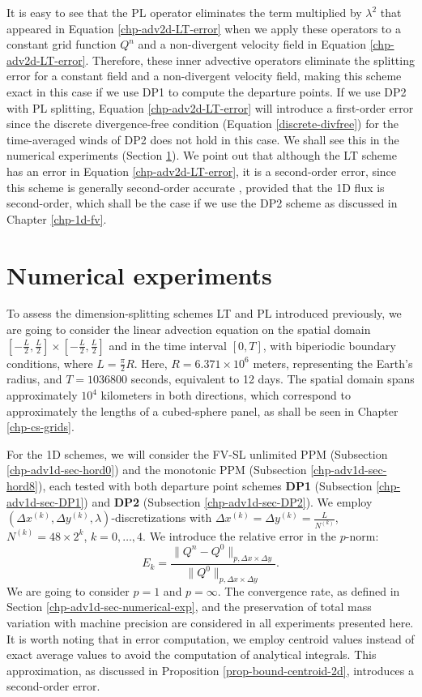 It is easy to see that the PL operator eliminates the term multiplied by $\lambda^2$ that appeared in Equation \eqref{chp-adv2d-LT-error}
when we apply these operators to a constant grid function $Q^n$ and a non-divergent velocity field in Equation \eqref{chp-adv2d-LT-error}.
Therefore, these inner advective operators eliminate the splitting error for a constant field and a non-divergent velocity field, making this scheme exact in this case
if we use DP1 to compute the departure points.
If we use DP2 with PL splitting, Equation \eqref{chp-adv2d-LT-error} will introduce a first-order error since the discrete divergence-free condition (Equation \eqref{discrete-divfree})
for the time-averaged winds of DP2 does not hold in this case.
We shall see this in the numerical experiments (Section \ref{sec-ds-exp}).
We point out that although the LT scheme has an error in Equation \eqref{chp-adv2d-LT-error}, it is a second-order error,
since this scheme is generally second-order accurate \citep{holden:2010}, provided that the 1D flux is second-order, 
which shall be the case if we use the DP2 scheme as discussed in Chapter \ref{chp-1d-fv}.

\section{Numerical experiments}
\label{sec-ds-exp}
To assess the dimension-splitting schemes LT and PL introduced previously, we are going to consider the linear advection 
equation on the spatial domain $[-\frac{L}{2},\frac{L}{2}]\times[-\frac{L}{2},\frac{L}{2}]$ and in the time interval $[0,T]$, 
with biperiodic boundary conditions, where $L = \frac{\pi}{2} R$. Here, $R = 6.371 \times 10^6$ meters, 
representing the Earth's radius, and $T = 1036800$ seconds, equivalent to 12 days. 
The spatial domain spans approximately $10^4$ kilometers in both directions,
which correspond to approximately the lengths of a cubed-sphere panel,
as shall be seen in Chapter \ref{chp-cs-grids}.

For the 1D schemes, we will consider the FV-SL unlimited PPM (Subsection \ref{chp-adv1d-sec-hord0}) and the monotonic PPM
(Subsection \ref{chp-adv1d-sec-hord8}), 
each tested with both departure point schemes \textbf{DP1} (Subsection \ref{chp-adv1d-sec-DP1}) and \textbf{DP2} (Subsection \ref{chp-adv1d-sec-DP2}).
We employ $(\Delta x^{(k)},\Delta y^{(k)},\lambda)$-discretizations with $\Delta x^{(k)} = \Delta y^{(k)} = \frac{L}{N^{(k)}}$,
$N^{(k)} = 48 \times 2^k$, $k=0,\ldots, 4$.
We introduce the relative error in the $p$-norm:
\begin{equation*}
	E_k = 
	\frac{\| Q^n - Q^0 \|_{p, \Delta x \times \Delta y}}
	{\|Q^0\|_{p, \Delta x \times \Delta y}}.
\end{equation*}
We are going to consider $p=1$ and $p=\infty$.
The convergence rate, as defined in Section \ref{chp-adv1d-sec-numerical-exp}, and the preservation of total mass variation with 
machine precision are considered in all experiments presented here.
It is worth noting that in error computation, we employ centroid values instead of exact average values to avoid 
the computation of analytical integrals.
This approximation, as discussed in Proposition \ref{prop-bound-centroid-2d}, introduces a second-order error.

